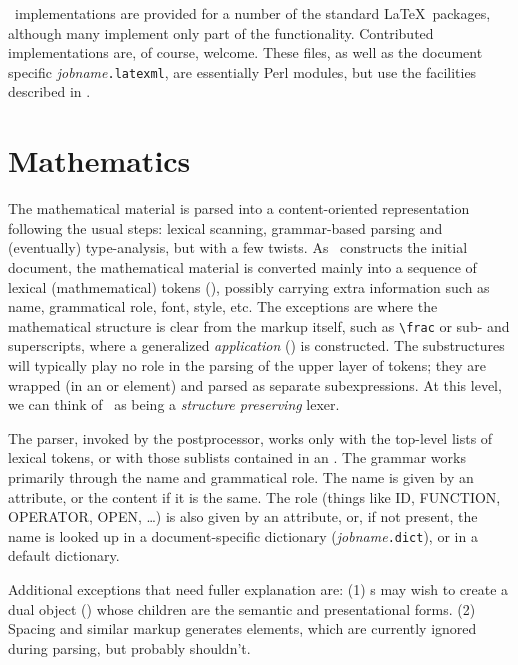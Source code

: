 \documentclass{article}
\newcommand{\LTXConstructor}{\pkg[LaTeXML::Definition]{LaTeXML::Constructor}}
\begin{document}
\LaTeXML\ implementations are provided for a number of the standard \LaTeX\ packages,
although many implement only part of the functionality.  Contributed implementations are,
of course, welcome.  These files, as well as the document specific \textit{jobname}\texttt{.latexml},
are essentially Perl modules, but use the facilities described in .

\section{Mathematics}\label{sec:math}
The mathematical material is parsed into a content-oriented representation following
the usual steps: lexical scanning, grammar-based parsing and (eventually) type-analysis, but
with a few twists. As \LaTeXML\ constructs the initial document, the mathematical material
is converted mainly into a sequence of lexical (mathmematical) tokens (), 
possibly carrying extra information such as name, grammatical role, font, style, etc.  
The exceptions are where the mathematical structure is clear from the markup itself, 
such as \verb|\frac| or sub- and superscripts, where a generalized \emph{application} ()
is constructed.  The substructures will typically play no role in the parsing of the upper 
layer of tokens; they are wrapped (in an  or  element) and parsed
as separate subexpressions.  At this level, we can think of \LaTeXML\ as being
a \emph{structure preserving} lexer.  

The parser, invoked by the postprocessor, works only with the top-level lists of lexical tokens,
or with those sublists contained in an .  The grammar works primarily through
the name and grammatical role.  The name is given by an attribute, or the content if it is
the same.  The role (things like ID, FUNCTION, OPERATOR, OPEN, \ldots) is also given
by an attribute, or, if not present, the name is looked up in a document-specific
dictionary (\textit{jobname}\texttt{.dict}), or in a default dictionary.

Additional exceptions that need fuller explanation are: 
(1) \LTXConstructor s may wish to create a dual object () whose children are 
the semantic and presentational forms.
(2) Spacing and similar markup generates  elements, which are currently ignored
during parsing, but probably shouldn't.

\appendix
\end{document}

